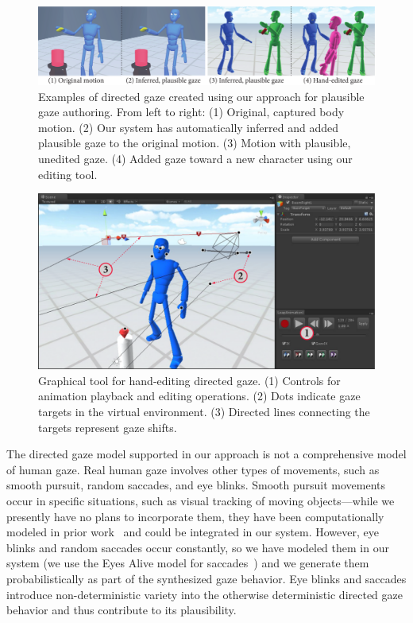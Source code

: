 \begin{figure}
\centering
\includegraphics[width=1\textwidth]{figures/PlausibleGazeAuthoring.pdf}
\caption{Examples of directed gaze created using our approach for plausible gaze authoring. From left to right: (1) Original, captured body motion. (2) Our system has automatically inferred and added plausible gaze to the original motion. (3) Motion with plausible, unedited gaze. (4) Added gaze toward a new character using our editing tool.}
\label{fig:PlausibleGazeAuthoring}
\end{figure}

\begin{figure}
\centering
\includegraphics[width=1\textwidth]{figures/GazeEditingTool.pdf}
\caption{Graphical tool for hand-editing directed gaze. (1) Controls for animation playback and editing operations. (2) Dots indicate gaze targets in the virtual environment. (3) Directed lines connecting the targets represent gaze shifts.}
\label{fig:GazeEditingTool}
\end{figure}

The directed gaze model supported in our approach is not a comprehensive model of human gaze. Real human gaze involves other types of movements, such as smooth pursuit, random saccades, and eye blinks. Smooth pursuit movements occur in specific situations, such as visual tracking of moving objects---while we presently have no plans to incorporate them, they have been computationally modeled in prior work~\citep{yeo2012eyecatch} and could be integrated in our system. However, eye blinks and random saccades occur constantly, so we have modeled them in our system (we use the Eyes Alive model for saccades~\citep{lee2002eyes}) and we generate them probabilistically as part of the synthesized gaze behavior. Eye blinks and saccades introduce non-deterministic variety into the otherwise deterministic directed gaze behavior and thus contribute to its plausibility.

